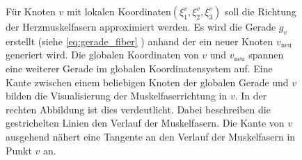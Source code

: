 \documentclass[
	a4paper,			%
	11pt,				%
	headsepline,		%
	bibtotoc,			%
	BCOR18mm,      		%
	DIV14,				%
	headings=normal,
	numbers=noenddot,
]{scrbook}
\theoremstyle{mythmstyle}
\theoremstyle{other}
\begin{document}
\begin{figure}[h]
	
	\caption{Für Knoten $v$ mit lokalen Koordinaten$ (\xi_1^v, \xi_2^v, \xi_3^v)$ soll die Richtung der 
	Herzmuskelfasern approximiert werden. Es wird die Gerade $g_v$ erstellt (siehe \autoref{eq:gerade_fiber} )
	anhand der ein neuer Knoten $v_{\text{neu}}$ generiert wird. Die globalen Koordinaten von $v$ und
	$v_{\text{neu}}$ spannen eine weiterer Gerade im globalen Koordinatensystem auf. Eine Kante zwischen einem
	beliebigen Knoten der globalen Gerade und $v$ bilden die Visualisierung der Muskelfaserrichtung in $v$.
	In der rechten Abbildung ist dies verdeutlicht. Dabei beschreiben die gestrichelten Linien den Verlauf
	der Muskelfasern. Die Kante von $v$ ausgehend nähert eine Tangente an den Verlauf der Muskelfasern in
	Punkt $v$ an. }
	\label{figure:fiber_new_node}
	\end{figure}
\end{document}
